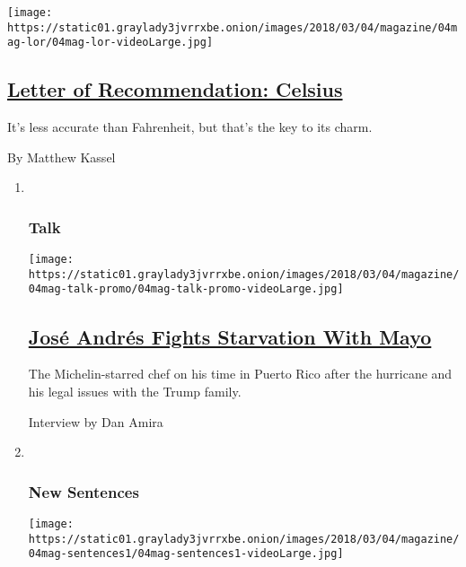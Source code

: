 \begin{enumerate}
  \texttt{[image: https://static01.graylady3jvrrxbe.onion/images/2018/03/04/magazine/04mag-lor/04mag-lor-videoLarge.jpg]}

  \hypertarget{letter-of-recommendation-celsius}{%
  \subsection{\texorpdfstring{\href{/2018/02/28/magazine/letter-of-recommendation-celsius.html}{Letter
  of Recommendation:
  Celsius}}{Letter of Recommendation: Celsius}}\label{letter-of-recommendation-celsius}}

  It's less accurate than Fahrenheit, but that's the key to its charm.

  By Matthew Kassel
\end{enumerate}

\begin{enumerate}
\def\labelenumi{\arabic{enumi}.}
\item ~
  \hypertarget{talk}{%
  \subsubsection{Talk}\label{talk}}

  \texttt{[image: https://static01.graylady3jvrrxbe.onion/images/2018/03/04/magazine/04mag-talk-promo/04mag-talk-promo-videoLarge.jpg]}

  \hypertarget{josuxe9-andruxe9s-fights-starvation-with-mayo}{%
  \subsection{\texorpdfstring{\href{/2018/02/28/magazine/jose-andres-fights-starvation-with-mayo.html}{José
  Andrés Fights Starvation With
  Mayo}}{José Andrés Fights Starvation With Mayo}}\label{josuxe9-andruxe9s-fights-starvation-with-mayo}}

  The Michelin-starred chef on his time in Puerto Rico after the
  hurricane and his legal issues with the Trump family.

  Interview by Dan Amira
\item ~
  \hypertarget{new-sentences}{%
  \subsubsection{New Sentences}\label{new-sentences}}

  \texttt{[image: https://static01.graylady3jvrrxbe.onion/images/2018/03/04/magazine/04mag-sentences1/04mag-sentences1-videoLarge.jpg]}


\end{enumerate}
